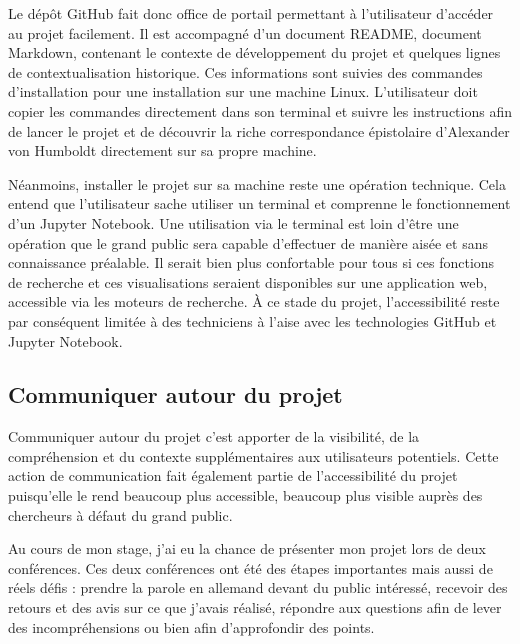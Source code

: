 \documentclass[a4paper, 12pt, twoside]{book}
\begin{document}
Le dépôt GitHub fait donc office de portail permettant à l'utilisateur d'accéder au projet facilement. Il est accompagné d'un document README, document Markdown, contenant le contexte de développement du projet et quelques lignes de contextualisation historique. Ces informations sont suivies des commandes d'installation pour une installation sur une machine Linux. L'utilisateur doit copier les commandes directement dans son terminal et suivre les instructions afin de lancer le projet et de découvrir la riche correspondance épistolaire d'Alexander von Humboldt directement sur sa propre machine. 

Néanmoins, installer le projet sur sa machine reste une opération technique. Cela entend que l'utilisateur sache utiliser un terminal et comprenne le fonctionnement d'un Jupyter Notebook. Une utilisation via le terminal est loin d'être une opération que le grand public sera capable d'effectuer de manière aisée et sans connaissance préalable. Il serait bien plus confortable pour tous si ces fonctions de recherche et ces visualisations seraient disponibles sur une application web, accessible via les moteurs de recherche. À ce stade du projet, l'accessibilité reste par conséquent limitée à des techniciens à l'aise avec les technologies GitHub et Jupyter Notebook.

\subsection{Communiquer autour du projet}
Communiquer autour du projet c'est apporter de la visibilité, de la compréhension et du contexte supplémentaires aux utilisateurs potentiels. Cette action de communication fait également partie de l'accessibilité du projet puisqu'elle le rend beaucoup plus accessible, beaucoup plus visible auprès des chercheurs à défaut du grand public.

Au cours de mon stage, j'ai eu la chance de présenter mon projet lors de deux conférences. Ces deux conférences ont été des étapes importantes mais aussi de réels défis : prendre la parole en allemand devant du public intéressé, recevoir des retours et des avis sur ce que j'avais réalisé, répondre aux questions afin de lever des incompréhensions ou bien afin d'approfondir des points. 
\end{document}
